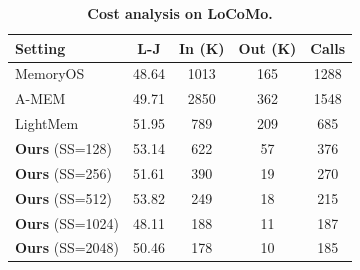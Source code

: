 \begin{table}[h]
    \footnotesize
    \centering
    \caption{\textbf{Cost analysis on LoCoMo.}}
    \label{tab:cost_analysis_chunk}
    \begin{tabular}{lcccc}
        \toprule
        \textbf{Setting} & \textbf{L-J} & \textbf{In (K)} & \textbf{Out (K)} & \textbf{Calls} \\
        \midrule
        MemoryOS  & 48.64 & 1013 & 165 & 1288 \\
        A-MEM     & 49.71 & 2850 & 362 & 1548 \\
        LightMem  & 51.95 & 789  & 209 & 685  \\
        \midrule
        \cellcolor{hl-llama}\textbf{Ours} (SS=128)  & \cellcolor{hl-llama}53.14 & \cellcolor{hl-llama}622 & \cellcolor{hl-llama}57 & \cellcolor{hl-llama}376 \\
        \cellcolor{hl-llama}\textbf{Ours} (SS=256)  & \cellcolor{hl-llama}51.61 & \cellcolor{hl-llama}390 & \cellcolor{hl-llama}19 & \cellcolor{hl-llama}270 \\
        \cellcolor{hl-llama}\textbf{Ours} (SS=512)  & \cellcolor{hl-llama}53.82 & \cellcolor{hl-llama}249 & \cellcolor{hl-llama}18 & \cellcolor{hl-llama}215 \\
        \cellcolor{hl-llama}\textbf{Ours} (SS=1024) & \cellcolor{hl-llama}48.11 & \cellcolor{hl-llama}188 & \cellcolor{hl-llama}11 & \cellcolor{hl-llama}187 \\
        \cellcolor{hl-llama}\textbf{Ours} (SS=2048) & \cellcolor{hl-llama}50.46 & \cellcolor{hl-llama}178 & \cellcolor{hl-llama}10 & \cellcolor{hl-llama}185 \\
        \bottomrule
    \end{tabular}
\end{table}